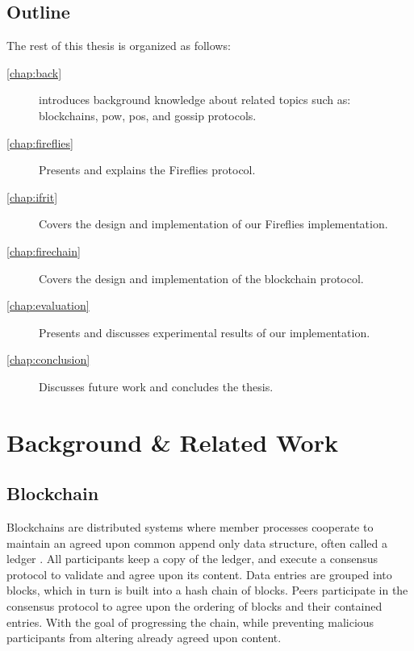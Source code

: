\documentclass[USenglish]{uit-thesis}
\begin{document}
\section{Outline}
The rest of this thesis is organized as follows:
\begin{description}
\item[\autoref{chap:back}] introduces background knowledge about related topics such as: blockchains, \gls{pow}, \gls{pos}, and gossip protocols.

\item[\autoref{chap:fireflies}] Presents and explains the Fireflies protocol.

\item[\autoref{chap:ifrit}] Covers the design and implementation of our Fireflies implementation.

\item[\autoref{chap:firechain}] Covers the design and implementation of the blockchain protocol.

\item[\autoref{chap:evaluation}] Presents and discusses experimental results of our implementation.

\item[\autoref{chap:conclusion}] Discusses future work and concludes the thesis.   
\end{description}



\chapter{Background \& Related Work} \label{chap:back}


\section{Blockchain}
Blockchains are distributed systems where member processes cooperate to maintain an agreed upon common append only data structure, often called a ledger \cite{bookblock, bitcoin}.
All participants keep a copy of the ledger, and execute a consensus protocol to validate and agree upon its content.
Data entries are grouped into blocks, which in turn is built into a hash chain of blocks.
Peers participate in the consensus protocol to agree upon the ordering of blocks and their contained entries.
With the goal of progressing the chain, while preventing malicious participants from altering already agreed upon content.
\end{document}
